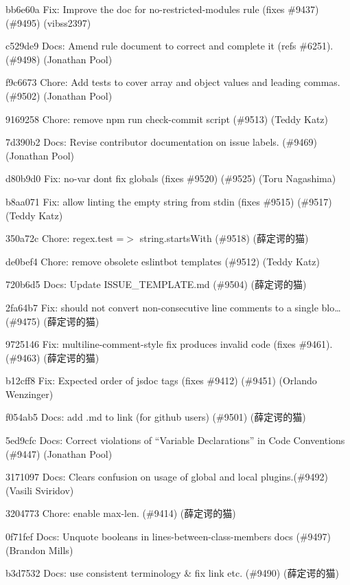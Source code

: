 \begin{DoxyItemize}
\item bb6e60a Fix\+: Improve the doc for no-\/restricted-\/modules rule (fixes \#9437) (\#9495) (vibss2397)
\item c529de9 Docs\+: Amend rule document to correct and complete it (refs \#6251). (\#9498) (Jonathan Pool)
\item f9c6673 Chore\+: Add tests to cover array and object values and leading commas. (\#9502) (Jonathan Pool)
\item 9169258 Chore\+: remove {\ttfamily npm run check-\/commit} script (\#9513) (Teddy Katz)
\item 7d390b2 Docs\+: Revise contributor documentation on issue labels. (\#9469) (Jonathan Pool)
\item d80b9d0 Fix\+: no-\/var don\textquotesingle{}t fix globals (fixes \#9520) (\#9525) (Toru Nagashima)
\item b8aa071 Fix\+: allow linting the empty string from stdin (fixes \#9515) (\#9517) (Teddy Katz)
\item 350a72c Chore\+: regex.\+test =\texorpdfstring{$>$}{>} string.\+starts\+With (\#9518) (薛定谔的猫)
\item de0bef4 Chore\+: remove obsolete eslintbot templates (\#9512) (Teddy Katz)
\item 720b6d5 Docs\+: Update ISSUE\+\_\+\+TEMPLATE.\+md (\#9504) (薛定谔的猫)
\item 2fa64b7 Fix\+: should not convert non-\/consecutive line comments to a single blo… (\#9475) (薛定谔的猫)
\item 9725146 Fix\+: multiline-\/comment-\/style fix produces invalid code (fixes \#9461). (\#9463) (薛定谔的猫)
\item b12cff8 Fix\+: Expected order of jsdoc tags (fixes \#9412) (\#9451) (Orlando Wenzinger)
\item f054ab5 Docs\+: add {\ttfamily .md} to link (for github users) (\#9501) (薛定谔的猫)
\item 5ed9cfc Docs\+: Correct violations of “\+Variable Declarations” in Code Conventions (\#9447) (Jonathan Pool)
\item 3171097 Docs\+: Clears confusion on usage of global and local plugins.(\#9492) (Vasili Sviridov)
\item 3204773 Chore\+: enable max-\/len. (\#9414) (薛定谔的猫)
\item 0f71fef Docs\+: Unquote booleans in lines-\/between-\/class-\/members docs (\#9497) (Brandon Mills)
\item b3d7532 Docs\+: use consistent terminology \& fix link etc. (\#9490) (薛定谔的猫)

\end{DoxyItemize}
